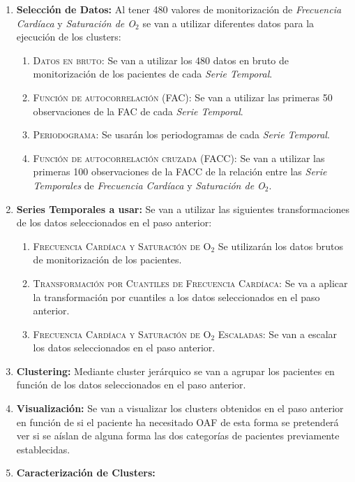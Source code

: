 \begin{enumerate}
    \item \textbf{Selección de Datos:} Al tener 480 valores de monitorización de \textit{Frecuencia Cardíaca} y \textit{Saturación de O$_2$} se van a utilizar diferentes datos para la ejecución de los clusters:
    \begin{enumerate}
        \item \textsc{Datos en bruto:} Se van a utilizar los 480 datos en bruto de monitorización de los pacientes de cada \textit{Serie Temporal}.
        \item \textsc{Función de autocorrelación (FAC):} Se van a utilizar las primeras 50 observaciones de la FAC de cada \textit{Serie Temporal}.
        \item \textsc{Periodograma:} Se usarán los periodogramas de cada \textit{Serie Temporal}.
        \item \textsc{Función de autocorrelación cruzada (FACC):} Se van a utilizar las primeras 100 observaciones de la FACC de la relación entre las \textit{Serie Temporales} de \textit{Frecuencia Cardíaca} y \textit{Saturación de O$_2$}.
    \end{enumerate}
    \item \textbf{Series Temporales a usar:} Se van a utilizar las siguientes transformaciones de los datos seleccionados en el paso anterior:
    \begin{enumerate}
        \item \textsc{Frecuencia Cardíaca y Saturación de O$_2$} Se utilizarán los datos brutos de monitorización de los pacientes.
        \item \textsc{Transformación por Cuantiles de Frecuencia Cardíaca:} Se va a aplicar la transformación por cuantiles a los datos seleccionados en el paso anterior.
        \item \textsc{Frecuencia Cardíaca y Saturación de O$_2$ Escaladas:} Se van a escalar los datos seleccionados en el paso anterior.
    \end{enumerate}
    \item \textbf{Clustering:} Mediante cluster jerárquico se van a agrupar los pacientes en función de los datos seleccionados en el paso anterior.
    \item \textbf{Visualización:} Se van a visualizar los clusters obtenidos en el paso anterior en función de si el paciente ha necesitado OAF de esta forma se pretenderá ver si se aíslan de alguna forma las dos categorías de pacientes previamente establecidas. 
    \item \textbf{Caracterización de Clusters:} 

\end{enumerate}
